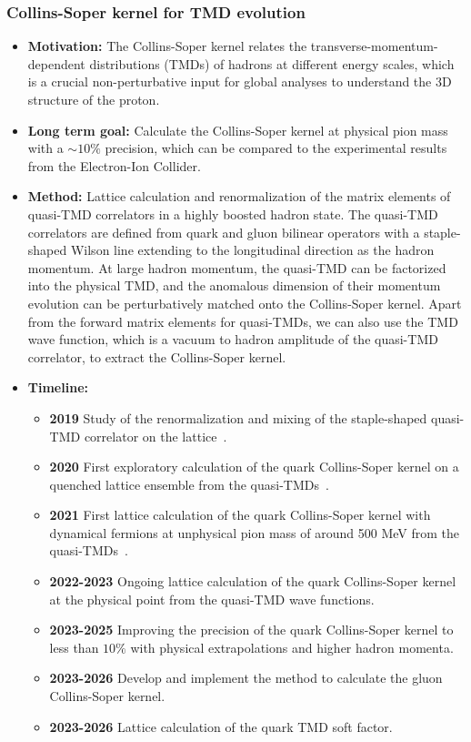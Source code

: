 \documentclass[12pt,hyperpdf]{article}
\begin{document}
\subsubsection{Collins-Soper kernel for TMD evolution}
\begin{itemize}
    \item{\bf Motivation:} The Collins-Soper kernel relates the
      transverse-momentum-dependent distributions (TMDs) of hadrons at
      different energy scales, which is a crucial non-perturbative
      input for global analyses to understand the 3D structure of the
      proton. 
    \item{\bf Long term goal:} Calculate the Collins-Soper kernel at
      physical pion mass with a $\sim 10\%$ precision, which can be
      compared to the experimental results from the Electron-Ion
      Collider. 
    \item{\bf Method:} Lattice calculation and renormalization of the
      matrix elements of quasi-TMD correlators in a highly boosted
      hadron state. The quasi-TMD correlators are defined from quark
      and gluon bilinear operators with a staple-shaped Wilson line
      extending to the longitudinal direction as the hadron
      momentum. At large hadron momentum, the quasi-TMD can be
      factorized into the physical TMD, and the anomalous dimension of
      their momentum evolution can be perturbatively matched onto the
      Collins-Soper kernel. Apart from the forward matrix elements for
      quasi-TMDs, we can also use the TMD wave function, which is a
      vacuum to hadron amplitude of the quasi-TMD correlator, to
      extract the Collins-Soper kernel. 
\item{\bf Timeline:}
\begin{itemize}
    \item{\bf 2019} Study of the renormalization and mixing of the
      staple-shaped quasi-TMD correlator on the
      lattice~\cite{Shanahan:2019zcq}. 
    \item{\bf 2020} First exploratory calculation of the quark
      Collins-Soper kernel on a quenched lattice ensemble from the
      quasi-TMDs~\cite{Shanahan:2020zxr}. 
    \item{\bf 2021} First lattice calculation of the quark Collins-Soper
      kernel with dynamical fermions at unphysical pion mass of around
      500 MeV from the quasi-TMDs~\cite{Shanahan:2021tst}. 
    \item{\bf 2022-2023} Ongoing lattice calculation of the quark
      Collins-Soper kernel at the physical point from the quasi-TMD
      wave functions. 
    \item{\bf 2023-2025} Improving the precision of the quark
      Collins-Soper kernel to less than $10\%$ with physical
      extrapolations and higher hadron momenta. 
    \item{\bf 2023-2026} Develop and implement the method to calculate the gluon Collins-Soper kernel.
    \item{\bf 2023-2026} Lattice calculation of the quark TMD soft factor.
\end{itemize}
\end{itemize}
\end{document}
